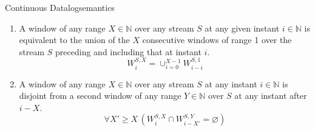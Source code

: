 \begin{nestedsection}{Continuous Datalog}{semantics}
\begin{enumerate}
			\begin{equation*}
				W^{S,X}_{i} = \varnothing
			\end{equation*}
		\item\label{axiom:continuous datalog: window composition}
			A window of any range ${X \in \mathbb{N}}$ over any stream $S$ at any given instant ${i \in \mathbb{N}}$ is equivalent to the union of the $X$ consecutive windows of range 1 over the stream $S$ preceding and including that at instant $i$.
			\begin{equation*}
				W^{S,X}_{i} = \mathop{\cup}_{i=0}^{X-1} W^{S,1}_{i-i}
			\end{equation*}
		\item\label{axiom:continuous datalog: window disjointness}
			A window of any range ${X \in \mathbb{N}}$ over any stream $S$ at any instant ${i \in \mathbb{N}}$ is disjoint from a second window of any range ${Y \in \mathbb{N}}$ over $S$ at any instant after ${i - X}$.
			\begin{equation*}
				\forall X' \geq X \, \left( W^{S,X}_{i} \cap W^{S,Y}_{i-X'} = \varnothing \right)
			\end{equation*}
		\setcounter{continuousDatalogAxioms}{\theenumi}
	\end{enumerate}


\end{nestedsection}
